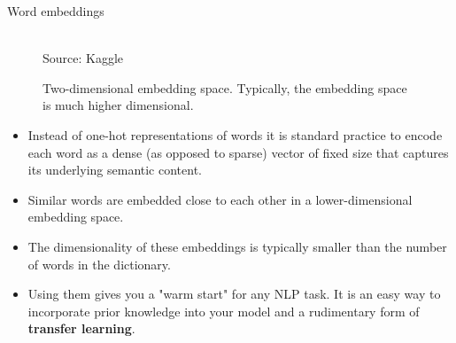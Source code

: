 %  
\begin{vbframe} {Word embeddings}
\begin{figure}
\vspace{-0.5cm}
      \centering
      \captionsetup{font=footnotesize,labelfont=footnotesize, labelfont = bf}
      \tiny{\\Source: Kaggle}
      \caption{\footnotesize{Two-dimensional embedding space. Typically, the embedding space is much higher dimensional.}}
      \vspace{-0.7cm}
        \end{figure}
  \begin{itemize}
    \item Instead of one-hot representations of words it is standard practice to encode each word as a dense (as opposed to sparse) vector of fixed size that captures its underlying semantic content.
    \item Similar words are embedded close to each other in a lower-dimensional embedding space. 
                \framebreak
    \item  The dimensionality of these embeddings is typically  smaller than the number of words in the dictionary. 
    \item Using them gives you a "warm start" for any NLP task. It is an easy way to incorporate prior knowledge into your model and a rudimentary form of \textbf{transfer learning}. 

\end{itemize}
\end{vbframe}

